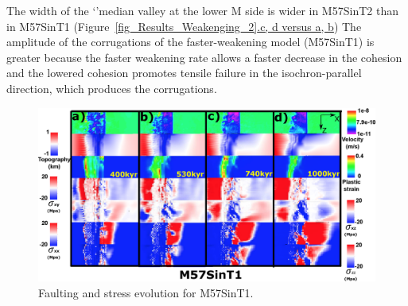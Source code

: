 The width of the `'median valley at the lower M side is wider in M57SinT2 than in M57SinT1 (Figure~\hyperref[fig_Results_Weakenging_2]{\ref{fig_Results_Weakenging_2}.c, d versus a, b})%
The amplitude of the corrugations of the faster-weakening model (M57SinT1) is greater because the faster weakening rate allows a faster decrease in the cohesion and the lowered cohesion promotes tensile failure in the isochron-parallel direction, which produces the corrugations.

\begin{figure}[h]
 \centering
  \includegraphics[width=1.0\textwidth]{./Figures/fig_Results_Weakening_3_M57SinT1_time_evolution.eps}
 \caption{Faulting and stress evolution for M57SinT1.}
\label{fig_Results_Weakenging_3}
\end{figure}

